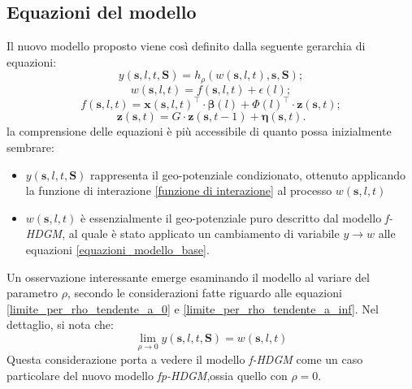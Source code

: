 \subsection[Equazioni del modello]{Equazioni del modello}
Il nuovo modello proposto viene così definito dalla seguente gerarchia di equazioni:
\begin{equation}
	y(\mathbf{s}, l, t,\mathbf{S}) = h_\rho(w(\mathbf{s}, l, t), \mathbf{s}, \mathbf{S});
	\label{eq_rumore_uscita}
\end{equation}
\begin{equation}
	w(\mathbf{s}, l, t)= f(\mathbf{s}, l, t) + \epsilon(l);
	\label{eq_rumore_uscita}
\end{equation}
\begin{equation}
	f(\mathbf{s}, l, t) = \mathbf{x}(\mathbf{s}, l, t)^\top\cdot\boldsymbol{\beta}(l) + \Phi(l)^\top\cdot\mathbf{z}(\mathbf{s}, t);
	\label{eq_comp_det}
\end{equation}
\begin{equation}
	\mathbf{z}(\mathbf{s}, t) = G\cdot \mathbf{z}(\mathbf{s}, t-1) + \boldsymbol{\eta}(\mathbf{s}, t).
	\label{eq_comp_lat}
\end{equation}
la comprensione delle equazioni è più accessibile di quanto possa inizialmente sembrare:
\begin{itemize}
	\item $y(\mathbf{s}, l, t,\mathbf{S})$ rappresenta il geo-potenziale condizionato, ottenuto applicando la funzione di interazione \ref{funzione di interazione} al processo $w(\mathbf{s}, l, t)$ 
	\item $w(\mathbf{s}, l, t)$ è essenzialmente il geo-potenziale puro descritto dal modello \textit{f-HDGM}, al quale è stato applicato un cambiamento di variabile $y \longrightarrow w$ alle equazioni \ref{equazioni_modello_base}.
\end{itemize}
Un osservazione interessante emerge esaminando il modello al variare del parametro $\rho$, secondo le considerazioni fatte riguardo alle equazioni \ref{limite_per_rho_tendente_a_0} e \ref{limite_per_rho_tendente_a_inf}. Nel dettaglio, si nota che:
\begin{equation}
	\lim_{\rho \to 0} y(\mathbf{s}, l, t,\mathbf{S}) = w(\mathbf{s}, l, t)
\end{equation}
Questa considerazione porta a vedere il modello \textit{f-HDGM} come un caso particolare del nuovo modello \textit{fp-HDGM},ossia quello con $\rho=0$.
